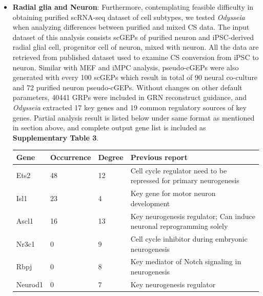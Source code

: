 \documentclass[fleqn,10pt]{wlscirep}
\begin{document}
\begin{itemize}
\item \textbf{Radial glia and Neuron}:
Furthermore, contemplating feasible difficulty in obtaining purified scRNA-seq dataset of cell subtypes, we tested \emph{Odysseia} when analyzing differences between purified and mixed CS data.
The input dataset of this analysis consists scGEPs of purified neuron and iPSC-derived radial glial cell, progenitor cell of neuron, mixed with neuron.
All the data are retrieved from published dataset used to examine CS conversion from iPSC to neuron.\cite{ips_neuron_ascl1}
Similar with MEF and iMPC analysis, pseudo-cGEPs were also generated with every 100 scGEPs which result in total of 90 neural co-culture and 72 purified neuron pseudo-cGEPs.
Without changes on other default parameters, 40441 GRPs were included in GRN reconstruct guidance, and \emph{Odysseia} extracted 17 key genes and 19 common regulatory sources of key genes.
Partial analysis result is listed below under same format as mentioned in section above, and complete output gene list is included as \textbf{Supplementary Table 3}.

\begin{table}[ht]
\centering
\begin{tabular}{|l|l|l|l|}
\hline
\textbf{Gene} & \textbf{Occurrence} & \textbf{Degree} & \textbf{Previous report}  \\
\hline
Ets2 & 48 & 12 & Cell cycle regulator need to be repressed for primary neurogenesis\cite{ets2_1, ets2_2} \\
\hline
Isl1 & 23 & 4 & Key gene for motor neuron development\cite{isl1_1, isl1_2011, isl1_repro}\\
\hline
Ascl1 & 16 & 13 & Key neurogenesis regulator\cite{ips_neuron_ascl1, ascl1_1}; Can induce neuronal reprogramming solely\cite{ascl1_1frepro ,ascl1_repro} \\
\hline
Nr3c1 & 0 & 9 & Cell cycle inhibitor during embryonic neurogenesis\cite{nr3c1}\\
\hline
Rbpj & 0 & 8 & Key mediator of Notch signaling in neurogenesis\cite{rbpj_1, rbpj_2, rbpj_3}\\
\hline
Neurod1 & 0 & 7 & Key neurogenesis regulator\cite{ips_neuron_ascl1, neurod1_1, neurod1_2, neurod1_3, neurod1_4} \\
\hline
\end{tabular}
\end{table}

\end{itemize}
\end{document}
